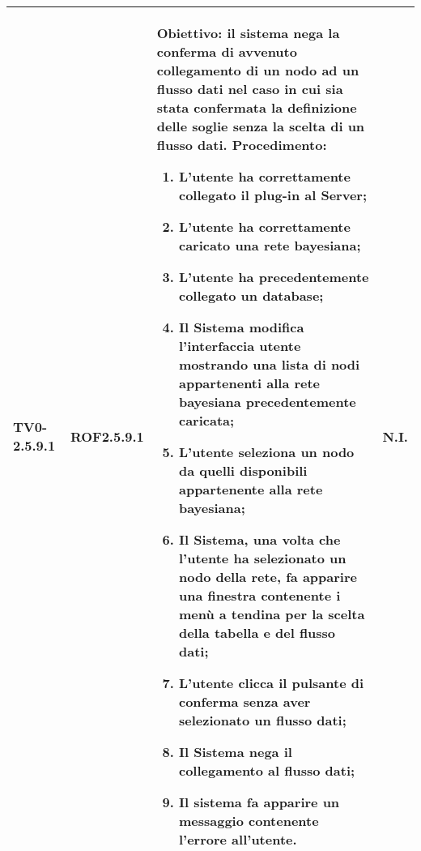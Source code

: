 \begin{longtable}{|C{.15\textwidth}|C{.13\textwidth}|m{.65\textwidth}|C{.08\textwidth}|}
TV0-2.5.9.1 & ROF2.5.9.1  &
	\textbf{Obiettivo}: il sistema nega la conferma di avvenuto collegamento di un nodo ad un flusso dati nel caso in cui sia stata confermata la definizione delle soglie senza la scelta di un flusso dati. \newline
	\textbf{Procedimento}:
	\begin{enumerate}
		\item L'utente ha correttamente collegato il plug-in al Server;
		\item L'utente ha correttamente caricato una rete bayesiana;
		\item L'utente ha precedentemente collegato un database;
		\item Il Sistema modifica l'interfaccia utente mostrando una lista di nodi appartenenti alla rete bayesiana precedentemente caricata;
		\item L'utente seleziona un nodo da quelli disponibili appartenente alla rete bayesiana;
		\item Il Sistema, una volta che l'utente ha selezionato un nodo della rete, fa apparire una finestra contenente i menù a tendina per la scelta della tabella e del flusso dati;
		\item L'utente clicca il pulsante di conferma senza aver selezionato un flusso dati;
		\item Il Sistema nega il collegamento al flusso dati;
		\item Il sistema fa apparire un messaggio contenente l'errore all'utente.
	\end{enumerate}
	& N.I. \\
\hline


\end{longtable}
